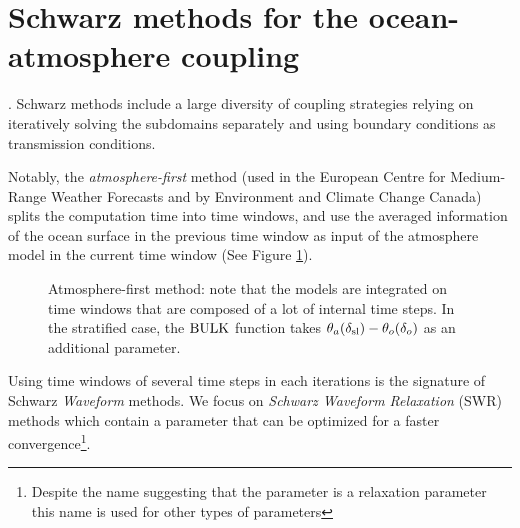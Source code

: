 \section{Schwarz methods for the ocean-atmosphere coupling}
\label{sec:airseaSCM_Schwarz}.
Schwarz methods include a large diversity of coupling
strategies relying on iteratively solving
the subdomains separately and using boundary
conditions as transmission conditions.
\par
Notably, the \textit{atmosphere-first} method
(used in the European Centre for Medium-Range Weather Forecasts
\citep{ecmwf_ifs_2020} and by Environment and Climate Change Canada)
splits the computation time into time windows, and use the
averaged information of the ocean surface in the previous
time window as input of the atmosphere model in the current
time window (See Figure \ref{fig:airseaSCM_atmFirst}).
\begin{figure}
\centering
\caption{Atmosphere-first method: note that the models are
	integrated on time windows that are composed of a lot
	of internal time steps. In the stratified case, the
	${\rm BULK}$ function takes $\theta_a(\delta_{\rm sl}) -
	\theta_o(\delta_o)$ as an additional parameter.}
\label{fig:airseaSCM_atmFirst}
\end{figure}
Using time windows of several time steps in each iterations
is the signature of Schwarz \textit{Waveform} methods.
We focus on \textit{Schwarz Waveform Relaxation} (SWR) methods
which contain a parameter that can be optimized for a faster
convergence\footnote{
Despite the name suggesting that the parameter is a relaxation
parameter this name is used for other types of parameters}.
